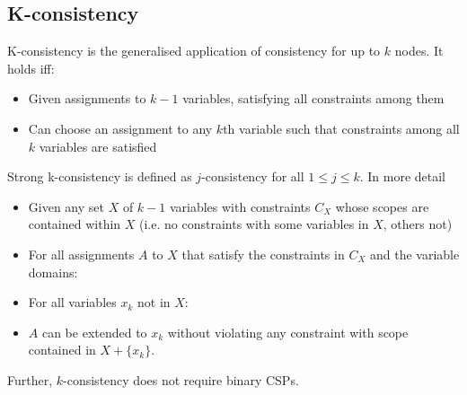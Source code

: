 \documentclass[CS4402-Notes.tex]{subfiles}
\begin{document}
\subsection{K-consistency}
K-consistency is the generalised application of consistency for up to $k$ nodes. It holds iff:
\begin{itemize}
\item Given assignments to $k - 1$ variables, satisfying all constraints among them
\item Can choose an assignment to any $k$th variable such that constraints among all $k$ variables are satisfied
\end{itemize}
Strong k-consistency is defined as $j$-consistency for all $1 \leq j \leq k$. In more detail
\begin{itemize}
\item Given any set $X$ of $k - 1$ variables with constraints $C_X$ whose scopes are contained within $X$ (i.e. no constraints with some variables in $X$, others not)
\item For all assignments $A$ to $X$ that satisfy the constraints in $C_X$ and the variable domains:
\item For all variables $x_k$ not in $X$:
\item $A$ can be extended to $x_k$ without violating any constraint with scope contained in $X + \{x_k\}$.
\end{itemize}
Further, $k$-consistency does not require binary CSPs. 
\end{document}
